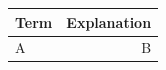 \begin{tabularx}{0.97\textwidth}{lr}
	\toprule
	\textbf{Term}                                      & \textbf{Explanation}\\
	\midrule
	A & B\\
	\bottomrule
\end{tabularx}